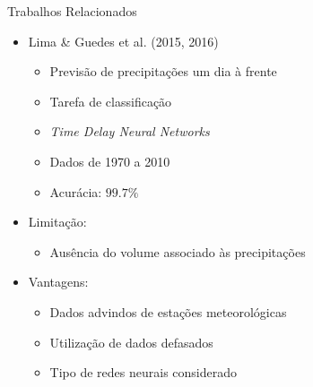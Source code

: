 \begin{frame}{Trabalhos Relacionados}
\begin{itemize}
  \item \alert{Lima \& Guedes} et al. (2015, 2016)
  \begin{itemize}
    \item Previsão de precipitações um dia à frente
    \item Tarefa de classificação
    \item \emph{Time Delay Neural Networks}
    \item Dados de 1970 a 2010
    \item Acurácia: $99.7\%$
  \end{itemize}
  \item \alert{Limitação}:
  \begin{itemize}
    \item Ausência do volume associado às precipitações
  \end{itemize}
  \item \alert{Vantagens}:
  \begin{itemize}
    \item Dados advindos de estações meteorológicas
    \item Utilização de dados defasados
    \item Tipo de redes neurais considerado
  \end{itemize}
\end{itemize}
\end{frame}
